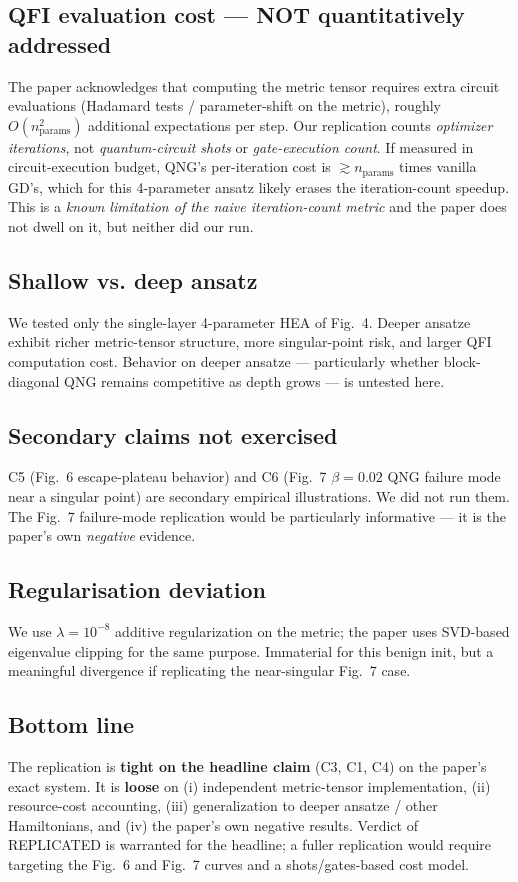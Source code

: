 \documentclass[11pt]{article}
\begin{document}
\subsection{QFI evaluation cost --- NOT quantitatively addressed}
The paper acknowledges that computing the metric tensor requires extra circuit evaluations
(Hadamard tests / parameter-shift on the metric), roughly $O(n_{\text{params}}^2)$ additional
expectations per step. Our replication counts \emph{optimizer iterations}, not
\emph{quantum-circuit shots} or \emph{gate-execution count}. If measured in circuit-execution
budget, QNG's per-iteration cost is $\gtrsim n_{\text{params}}$ times vanilla GD's, which for
this 4-parameter ansatz likely erases the iteration-count speedup. This is a \emph{known limitation
of the naive iteration-count metric} and the paper does not dwell on it, but neither did our run.

\subsection{Shallow vs. deep ansatz}
We tested only the single-layer 4-parameter HEA of Fig.~4. Deeper ansatze exhibit richer
metric-tensor structure, more singular-point risk, and larger QFI computation cost. Behavior on
deeper ansatze --- particularly whether block-diagonal QNG remains competitive as depth grows ---
is untested here.

\subsection{Secondary claims not exercised}
C5 (Fig.~6 escape-plateau behavior) and C6 (Fig.~7 $\beta=0.02$ QNG failure mode near a singular
point) are secondary empirical illustrations. We did not run them. The Fig.~7 failure-mode
replication would be particularly informative --- it is the paper's own \emph{negative} evidence.

\subsection{Regularisation deviation}
We use $\lambda=10^{-8}$ additive regularization on the metric; the paper uses SVD-based
eigenvalue clipping for the same purpose. Immaterial for this benign init, but a meaningful
divergence if replicating the near-singular Fig.~7 case.

\subsection{Bottom line}
The replication is \textbf{tight on the headline claim} (C3, C1, C4) on the paper's exact system.
It is \textbf{loose} on (i) independent metric-tensor implementation, (ii) resource-cost accounting,
(iii) generalization to deeper ansatze / other Hamiltonians, and (iv) the paper's own negative
results. Verdict of REPLICATED is warranted for the headline; a fuller replication would require
targeting the Fig.~6 and Fig.~7 curves and a shots/gates-based cost model.
\end{document}
